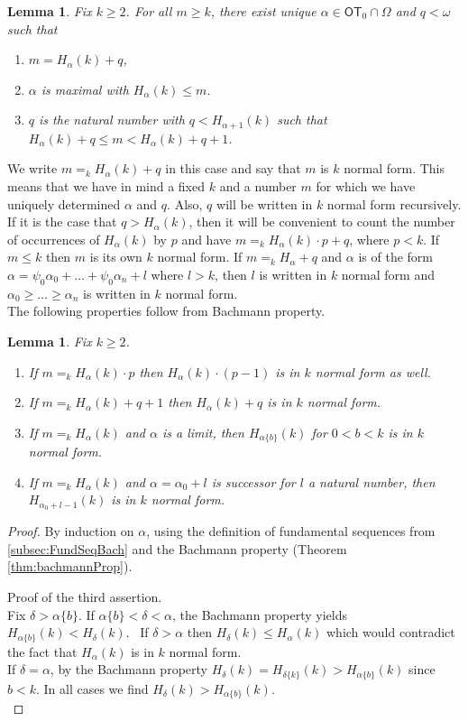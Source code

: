 \documentclass{amsart}
\theoremstyle{plain}
\theoremstyle{plain}
\newtheorem{lemma}[theorem]{Lemma}
\newcommand\OT{\mathsf{OT}}
\newcommand{\Om}{{\Omega}}
\newcommand{\al}{{\alpha}}
\newcommand{\de}{\delta}
\newcommand{\om}{\omega}
\begin{document}
\begin{lemma}\label{lm:HardyNF}
Fix $k\geq 2$.  For all $m\geq k$, there exist unique $\al\in  \OT_0\cap \Om$ and $q<\om$ such that
\begin{enumerate}
    \item $m=H_\al(k) +q$,
    \item $\al$ is maximal with $H_\al(k) \leq m$. %
    \item $q$ is the natural number with $q < H_{\al+1}(k)$ such that $H_\al(k) +q \leq m < H_\al(k) +q+1$.
\end{enumerate}
\end{lemma}
We write $m=_{k} H_\al(k)+q$ in this case and say that $m$ is $k$ normal form. This means that we have in mind a fixed $k$ and a number $m$ for which we have uniquely determined $\al$ and $q$. Also, $q$ will be written in $k$ normal form recursively.
If it is the case that $q>H_\al(k)$, then it will be convenient to count the number of occurrences of $H_\al(k)$ by $p$ and have $m=_{k} H_\al(k) \cdot p + q$, where $p<k$.
If $m\leq k$ then $m$ is its own $k$ normal form. 
If $m=_{k}H_\al +q$ and $\al$ is of the form $\al = \psi_0\al_0+\ldots +\psi_0\al_n+ l$ where $l>k$, then $l$ is written in $k$ normal form and $\al_0\geq\ldots \geq \al_n$ is written in $k$ normal form.\medskip
\\
The following properties follow from Bachmann property.
\begin{lemma}\label{lm:NForms} Fix $k\geq 2$.
\begin{enumerate}
    \item If $m=_{k} H_\al(k) \cdot p$ then $H_\al(k) \cdot (p-1)$ is in $k$ normal form as well.
    \item If  $m=_{k} H_\al(k) +q+1$ then $H_\al(k) + q$ is in $k$ normal form.
    \item If $m=_{k}H_\al(k)$ and $\al$ is a limit, then $H_{\al\{b\}}(k)$ for $0<b<k$ is in $k$ normal form. 
    \item If $m=_{k}H_{\al}(k)$ and $\al =\al_0+l$ is successor for $l$ a natural number,
    then $H_{\al_0+l-1}(k)$ is in $k$ normal form. 
\end{enumerate}
\end{lemma}
\begin{proof}
By induction on $\al$, using the definition of fundamental sequences from \ref{subsec:FundSeqBach} and the Bachmann property (Theorem \ref{thm:bachmannProp}).

Proof of the third assertion.\\
Fix $\de>\al\{b\}$. 
If $\al\{b\} <\de<\al$, the Bachmann property yields $H_{\al\{b\}}(k) <H_\de(k)$.
\
If $\de>\al$ then $H_\de(k)\leq H_\al(k)$ which would contradict the fact that $H_\al(k)$ is in $k$ normal form. 
\\
If $\de=\al$, by the Bachmann property $H_\de(k) = H_{\de\{k\}} (k)> H_{\al\{b\}}(k)$ since $b<k$.
In all cases we find $H_{\de}(k)>H_{\al\{b\}}(k)$.\medskip\\
\end{proof}
\end{document}
